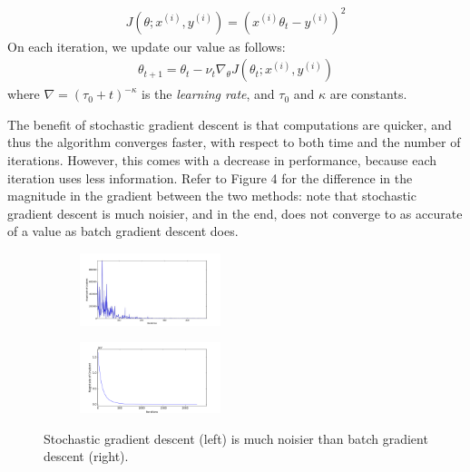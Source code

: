 \documentclass[10pt]{paper}
\begin{document}
\begin{align*}
J(\theta; x^{(i)}, y^{(i)}) = (x^{(i)}\theta_t - y^{(i)})^2
\end{align*}
On each iteration, we update our value as follows:
\begin{align*}
\theta_{t+1} = \theta_{t} - \nu_t \nabla_\theta J(\theta_t; x^{(i)}, y^{(i)})
\end{align*}
where $\nabla = (\tau_0 + t)^{-\kappa}$ is the \emph{learning rate}, and $\tau_0$ and $\kappa$ are constants.

The benefit of stochastic gradient descent is that computations are quicker, and thus the algorithm converges faster, with respect to both time and the number of iterations. However, this comes with a decrease in performance, because each iteration uses less information. Refer to Figure 4 for the difference in the magnitude in the gradient between the two methods: note that stochastic gradient descent is much noisier, and in the end, does not converge to as accurate of a value as batch gradient descent does.

\begin{figure}[ht!]
  \center
  \begin{subfigure}
    \centering
      \includegraphics[width=0.45\textwidth]{../images/stochastic_gradient_steps}
  \end{subfigure}
  \begin{subfigure}
    \centering
      \includegraphics[width=0.45\textwidth]{../images/batch_gradient_steps_2}
  \end{subfigure}
  \caption{Stochastic gradient descent (left) is much noisier than batch gradient descent (right).}
\end{figure}
\end{document}
